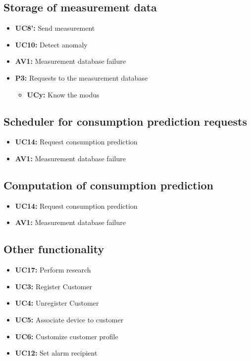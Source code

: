 \subsection{Storage of measurement data}
\begin{itemize}
	\item \textbf{UC8': } Send measurement
	\item \textbf{UC10: } Detect anomaly
	\item \textbf{AV1: } Measurement database failure
	\item \textbf{P3: } Requests to the measurement database
		\begin{itemize}
		\item \textbf{UCy: } Know the modus
	\end{itemize}
\end{itemize}

\subsection{Scheduler for consumption prediction requests}
\begin{itemize}
	\item \textbf{UC14: } Request consumption prediction
	\item \textbf{AV1: } Measurement database failure
\end{itemize}

\subsection{Computation of consumption prediction}
\begin{itemize}
	\item \textbf{UC14: } Request consumption prediction
	\item \textbf{AV1: } Measurement database failure
\end{itemize}

\subsection{Other functionality}
\begin{itemize}
	\item \textbf{UC17: } Perform research 
	\item \textbf{UC3: } Register Customer 
	\item \textbf{UC4: } Unregister Customer
	\item \textbf{UC5: } Associate device to customer
	\item \textbf{UC6: } Customize customer profile 
	\item \textbf{UC12: } Set alarm recipient
\end{itemize}

